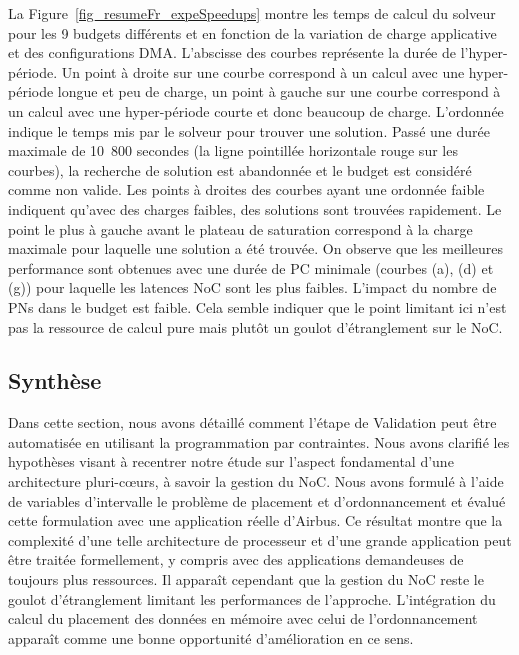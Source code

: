 \documentclass[main.tex]{subfiles}
\begin{document}
La Figure~\ref{fig_resumeFr_expeSpeedups} montre les temps de calcul du solveur pour les 9 budgets différents et en fonction de la variation de charge applicative et des configurations DMA. L'abscisse des courbes représente la durée de l'hyper-période. Un point à droite sur une courbe correspond à un calcul avec une hyper-période longue et peu de charge, un point à gauche sur une courbe correspond à un calcul avec une hyper-période courte et donc beaucoup de charge. L'ordonnée indique le temps mis par le solveur pour trouver une solution. Passé une durée maximale de 10~800 secondes (la ligne pointillée horizontale rouge sur les courbes), la recherche de solution est abandonnée et le budget est considéré comme non valide. Les points à droites des courbes ayant une ordonnée faible indiquent qu'avec des charges faibles, des solutions sont trouvées rapidement. Le point le plus à gauche avant le plateau de saturation correspond à la charge maximale pour laquelle une solution a été trouvée. On observe que les meilleures performance sont obtenues avec une durée de PC minimale (courbes (a), (d) et (g)) pour laquelle les latences NoC sont les plus faibles. L'impact du nombre de PNs dans le budget est faible. Cela semble indiquer que le point limitant ici n'est pas la ressource de calcul pure mais plutôt un goulot d'étranglement sur le NoC.



\subsection{Synthèse}
Dans cette section, nous avons détaillé comment l'étape de Validation peut être automatisée en utilisant la programmation par contraintes. Nous avons clarifié les hypothèses visant à recentrer notre étude sur l'aspect fondamental d'une architecture pluri-c\oe{}urs, à savoir la gestion du NoC. Nous avons formulé à l'aide de variables d'intervalle le problème de placement et d'ordonnancement et évalué cette formulation avec une application réelle d'Airbus. Ce résultat montre que la complexité d'une telle architecture de processeur et d'une grande application peut être traitée formellement, y compris avec des applications demandeuses de toujours plus ressources. Il apparaît cependant que la gestion du NoC reste le goulot d'étranglement limitant les performances de l'approche. L'intégration du calcul du placement des données en mémoire avec celui de l'ordonnancement apparaît comme une bonne opportunité d'amélioration en ce sens.
\end{document}
